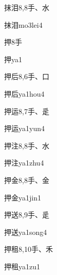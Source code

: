 \begin{entry}{抹泪}{8,8}{⼿、⽔}
  \begin{phonetics}{抹泪}{mo3lei4}
  \end{phonetics}
\end{entry}

\begin{entry}{押}{8}{⼿}
  \begin{phonetics}{押}{ya1}
  \end{phonetics}
\end{entry}

\begin{entry}{押后}{8,6}{⼿、⼝}
  \begin{phonetics}{押后}{ya1hou4}
  \end{phonetics}
\end{entry}

\begin{entry}{押运}{8,7}{⼿、⾡}
  \begin{phonetics}{押运}{ya1yun4}
  \end{phonetics}
\end{entry}

\begin{entry}{押注}{8,8}{⼿、⽔}
  \begin{phonetics}{押注}{ya1zhu4}
  \end{phonetics}
\end{entry}

\begin{entry}{押金}{8,8}{⼿、⾦}
  \begin{phonetics}{押金}{ya1jin1}
  \end{phonetics}
\end{entry}

\begin{entry}{押送}{8,9}{⼿、⾡}
  \begin{phonetics}{押送}{ya1song4}
  \end{phonetics}
\end{entry}

\begin{entry}{押租}{8,10}{⼿、⽲}
  \begin{phonetics}{押租}{ya1zu1}
  \end{phonetics}
\end{entry}


